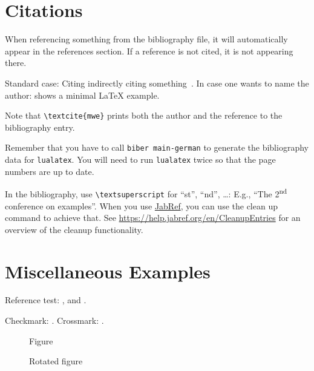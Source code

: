 \section{Citations}

When referencing something from the bibliography file, it will automatically appear in the references section.
If a reference is not cited, it is not appearing there.

\begin{ltgexample}
Standard case: Citing indirectly citing something~\cite{mwe}.
In case one wants to name the author: \textcite{mwe} shows a minimal \LaTeX{} example.
\end{ltgexample}

Note that \texttt{\textbackslash textcite\{mwe\}} prints both the author and the reference to the bibliography entry.

Remember that you have to call \texttt{biber main-german} to generate the bibliography data for \texttt{lualatex}.
You will need to run \texttt{lualatex} twice so that the page numbers are up to date.


In the bibliography, use \texttt{\textbackslash textsuperscript} for \enquote{st}, \enquote{nd}, \ldots:
E.g., \enquote{The 2\textsuperscript{nd} conference on examples}.
When you use \href{https://www.jabref.org}{JabRef}, you can use the clean up command to achieve that.
See \url{https://help.jabref.org/en/CleanupEntries} for an overview of the cleanup functionality.

\section{Miscellaneous Examples}
\label{ssec:example}

Reference test: ,  and .

\begin{ltgexample}
Checkmark: \dingcheck.
Crossmark: \dingcross.
\end{ltgexample}

\begin{figure}
  \missingfigure{}
  \caption{Figure}
  \label{fig:Abbildung}
\end{figure}

\begin{landscape}
  \begin{figure}
    \missingfigure{}
    \caption{Rotated figure}
    \label{fig:AbbildungGedreht}
  \end{figure}
\end{landscape}

